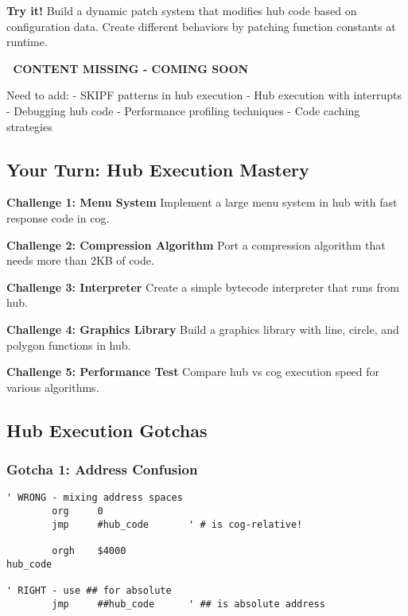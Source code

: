 \documentclass[11pt]{book}
\begin{document}
\textbf{Try it!} Build a dynamic patch system that modifies hub code
based on configuration data. Create different behaviors by patching
function constants at runtime.

\begin{missing}
🚧 \textbf{CONTENT MISSING - COMING SOON}

Need to add:
- SKIPF patterns in hub execution
- Hub execution with interrupts
- Debugging hub code
- Performance profiling techniques
- Code caching strategies
\end{missing}

\hypertarget{your-turn-hub-execution-mastery}{%
\subsection{Your Turn: Hub Execution
Mastery}\label{your-turn-hub-execution-mastery}}

\begin{yourturn}
\textbf{Challenge 1: Menu System}
Implement a large menu system in hub with fast response code in cog.

\textbf{Challenge 2: Compression Algorithm}
Port a compression algorithm that needs more than 2KB of code.

\textbf{Challenge 3: Interpreter}
Create a simple bytecode interpreter that runs from hub.

\textbf{Challenge 4: Graphics Library}
Build a graphics library with line, circle, and polygon functions in hub.

\textbf{Challenge 5: Performance Test}
Compare hub vs cog execution speed for various algorithms.
\end{yourturn}

\hypertarget{hub-execution-gotchas}{%
\subsection{Hub Execution Gotchas}\label{hub-execution-gotchas}}

\hypertarget{gotcha-1-address-confusion}{%
\subsubsection{Gotcha 1: Address
Confusion}\label{gotcha-1-address-confusion}}

\begin{lstlisting}
' WRONG - mixing address spaces
        org     0
        jmp     #hub_code       ' # is cog-relative!
        
        orgh    $4000
hub_code
        
' RIGHT - use ## for absolute
        jmp     ##hub_code      ' ## is absolute address
\end{lstlisting}
\end{document}
